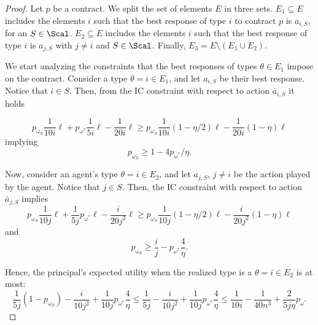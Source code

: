 \begin{proof}
	Let $p$ be a contract.
	We split the set of elements $E$ in three sets.
	$E_1\subseteq E$ includes the elements $i$ such that the best response of type $i$ to contract $p$ is $a_{i,S}$, for an $S \in \Scal$.
	$E_2\subseteq E$ includes  the elements $i$ such that the best response of type $i$ is $a_{j,S}$ with $j\neq i$ and $S \in \Scal$.
	Finally, $E_3=E \setminus (E_1\cup E_2)$.
	
	We start analyzing the constraints that the best responses of types $\theta \in E_1$ impose on the contract.
	Consider a type $\theta=i \in E_1$, and let $a_{i,S}$ be their best response. Notice that $i\in S$.
	Then, from the IC constraint with respect to action $\bar a_{i,S}$ it holds
	
	\[p_{\omega_{S}}\frac{1}{10i}\ell + p_{\omega^*}  \frac{1}{5i}\ell- \frac{1}{20i}\ell \ge  p_{\omega_{S}}\frac{1}{10i} (1-\eta/2)\ell - \frac{1}{20i} (1-\eta) \ell \]
	implying
	\[p_{\omega_{S}}\ge 1-4  p_{\omega^*}/\eta.\]
	
	Now, consider an agent's type $\theta=i\in E_2$, and let $a_{j,S}$, $j \neq i$ be the action played by the agent. 
	Notice that $j \in S$. Then, the IC constraint with respect to action $\bar a_{j,S}$ implies
	\[ p_{\omega_{S}} \frac{1}{10j} \ell + \frac{1}{5j}p_{\omega^*}\ell- \frac{i}{20j^2}\ell \ge p_{\omega_{S}} \frac{1}{10j} (1-\eta/2) \ell- \frac{i}{20j^2} (1-\eta) \ell \]
	and
	\[ p_{\omega_{S}} \ge \frac{i}{j}- p_{\omega^*} \frac{4}{\eta}. \]
	
	Hence, the principal's expected utility when the realized type is a $\theta=i \in E_2$ is at most:
	\[ \frac{1}{5j} (1-p_{\omega_{S}}) - \frac{i}{10j^2} +  \frac{1}{10j} p_{\omega^*} \frac{4}{\eta}\le \frac{1}{5j} - \frac{i}{10j^2} +  \frac{1}{10j} p_{\omega^*} \frac{4}{\eta}
	\le \frac{1}{10i}-\frac{1}{40n^3}  + \frac{2}{5j\eta}p_{\omega^*}  \]
	

\end{proof}
